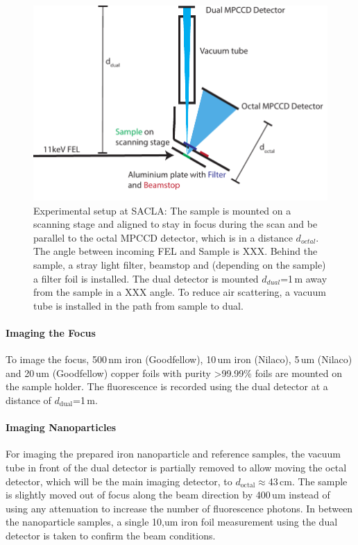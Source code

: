\begin{figure}
	\centering
	\includegraphics[width=0.75\linewidth]{images/setup.pdf}
	\caption[Experimental setup at SACLA]{Experimental setup at SACLA: The sample is mounted on a scanning stage and aligned to stay in focus during the scan and be parallel to the octal MPCCD detector, which is in a distance $d_{octal}$. The angle between incoming FEL and Sample is XXX. Behind the sample, a stray light filter, beamstop and (depending on the sample) a filter foil is installed. The dual detector is mounted $d_{dual}$=1\,m away from the sample in a XXX angle. To reduce air scattering, a vacuum tube is installed in the path from sample to dual.}
	\label{fig:setup}
\end{figure}
\paragraph{Imaging the Focus}
To image the focus, 500\,nm iron (Goodfellow), 10\,um iron (Nilaco), 5\,um (Nilaco) and 20\,um (Goodfellow) copper foils with purity >99.99\% foils are mounted on the sample holder. The fluorescence is recorded using the dual detector at a distance of $d_\text{dual}$=1\,m.
\paragraph{Imaging Nanoparticles}
For imaging the prepared iron nanoparticle and reference samples, the vacuum tube in front of the dual detector is partially removed to allow moving the octal detector, which will be the main imaging detector, to $d_\text{octal}\approx$43\,cm. The sample is slightly moved out of focus along the beam direction by 400\,um instead of using any attenuation to increase the number of fluorescence photons. In between the nanoparticle samples, a single 10,um iron foil measurement using the dual detector is taken to confirm the beam conditions.

